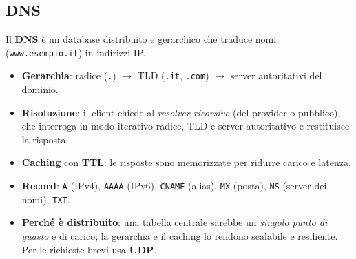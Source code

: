 \subsection{DNS}
Il \textbf{DNS} è un database distribuito e gerarchico che traduce nomi (\texttt{www.esempio.it}) in indirizzi IP.
\begin{itemize}
    \item \textbf{Gerarchia}: radice (\texttt{.}) $\to$ TLD (\texttt{.it}, \texttt{.com}) $\to$ server autoritativi del dominio.
    \item \textbf{Risoluzione}: il client chiede al \emph{resolver ricorsivo} (del provider o pubblico), che interroga in modo iterativo radice, TLD e server autoritativo e restituisce la risposta.
    \item \textbf{Caching} con \textbf{TTL}: le risposte sono memorizzate per ridurre carico e latenza.
    \item \textbf{Record}: \texttt{A} (IPv4), \texttt{AAAA} (IPv6), \texttt{CNAME} (alias), \texttt{MX} (posta), \texttt{NS} (server dei nomi), \texttt{TXT}.
    \item \textbf{Perché è distribuito}: una tabella centrale sarebbe un \emph{singolo punto di guasto} e di carico; la gerarchia e il caching lo rendono scalabile e resiliente. Per le richieste brevi usa \textbf{UDP}.
\end{itemize}

